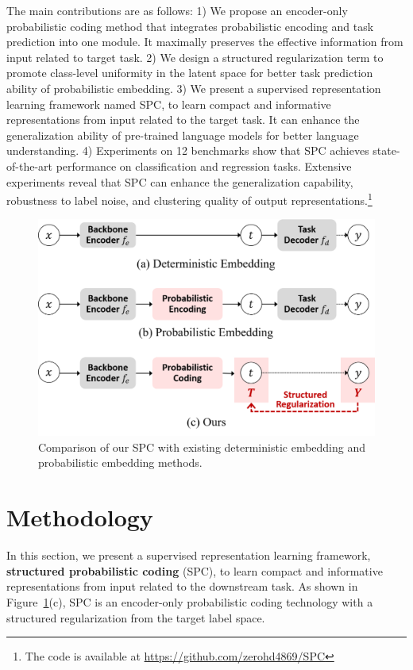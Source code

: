 \documentclass[letterpaper]{article} %
\begin{document}
The main contributions are as follows:
    1) We propose an encoder-only probabilistic coding method that integrates probabilistic encoding and task prediction into one module. It maximally preserves the effective information from input related to target task.
    2) We design a structured regularization term to promote class-level uniformity in the latent space for better task prediction ability of probabilistic embedding.
    3)  We present a supervised representation learning framework named SPC, to learn compact and informative representations from input related to the target task. It can enhance the generalization ability of pre-trained language models for better language understanding.
    4) Experiments on 12 benchmarks show that SPC achieves state-of-the-art performance on classification and regression tasks. Extensive experiments reveal that SPC can enhance the generalization capability, robustness to label noise, and clustering quality of output representations.\footnote{The code is available at \url{https://github.com/zerohd4869/SPC}}


\begin{figure}[t]
\centering
\includegraphics[width=0.82\columnwidth]{figures/intro_t.png}
\caption{Comparison of our SPC with existing deterministic embedding and probabilistic embedding methods.}
\label{fig1}
\end{figure}

\section{Methodology}
In this section, we present a supervised representation learning framework, \textbf{structured probabilistic coding} (SPC), to learn compact and informative representations from input related to the downstream task.
As shown in Figure~\ref{fig1}(c), SPC is an encoder-only probabilistic coding technology with a structured regularization from the target label space.
\end{document}
